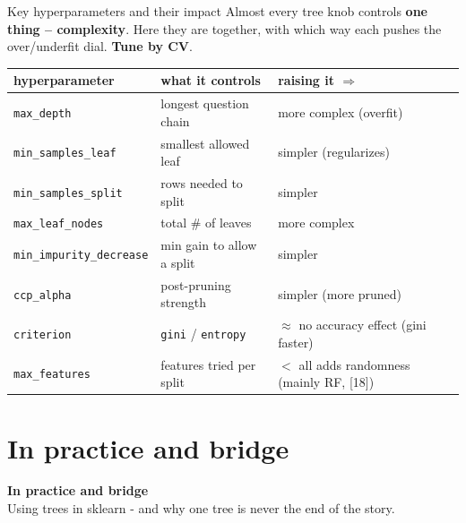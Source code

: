 \documentclass[aspectratio=169]{beamer}
\newcommand{\sectiontransition}[2]{%
  \begin{frame}[plain]
    \vfill
    \begin{center}
      {\Large\color{popblue}\textbf{#1}}\\[10pt]
      {\normalsize #2}
    \end{center}
    \vfill
  \end{frame}}
\begin{document}
\begin{frame}{Key hyperparameters and their impact}
  Almost every tree knob controls \textbf{one thing -- complexity}. Here they are
  together, with which way each pushes the over/underfit dial. \textbf{Tune by CV}.
  \vskip 2pt
  \begin{center}\footnotesize
    \renewcommand{\arraystretch}{1.2}
    \begin{tabular}{l l l}
      hyperparameter & what it controls & raising it $\Rightarrow$ \\
      \hline
      \texttt{max\_depth} & longest question chain & more complex (\textcolor{armred}{overfit}) \\
      \texttt{min\_samples\_leaf} & smallest allowed leaf & simpler (\textcolor{armblue}{regularizes}) \\
      \texttt{min\_samples\_split} & rows needed to split & simpler \\
      \texttt{max\_leaf\_nodes} & total \# of leaves & more complex \\
      \texttt{min\_impurity\_decrease} & min gain to allow a split & simpler \\
      \texttt{ccp\_alpha} & post-pruning strength & simpler (more pruned) \\
      \texttt{criterion} & \texttt{gini} / \texttt{entropy} & $\approx$ no accuracy effect (gini faster) \\
      \texttt{max\_features} & features tried per split & $<$ all adds randomness (mainly RF, [18]) \\
      \hline
    \end{tabular}
  \end{center}
  \vskip 2pt
\end{frame}

\section{In practice and bridge}
\sectiontransition{In practice and bridge}{Using trees in sklearn - and why one tree is never the end of the story.}
\end{document}
